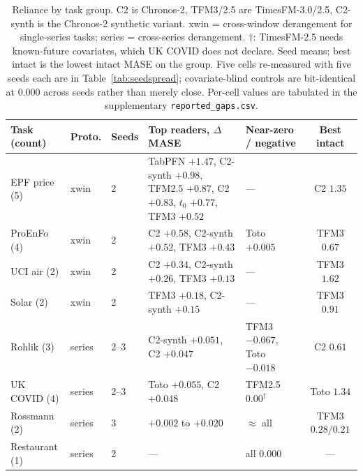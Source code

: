 \begin{table}[t]
\centering
\small
\begin{tabular}{@{}lp{0.9cm}p{0.8cm}p{6.0cm}p{3.3cm}c@{}}
\toprule
Task (count) & Proto. & Seeds & Top readers, $\Delta$MASE & Near-zero / negative & Best intact \\
\midrule
EPF price (5) & xwin & 2 & TabPFN $+1.47$, C2-synth $+0.98$, TFM2.5 $+0.87$, C2 $+0.83$, $t_0$ $+0.77$, TFM3 $+0.52$ & --- & C2 $1.35$ \\
ProEnFo (4) & xwin & 2 & C2 $+0.58$, C2-synth $+0.52$, TFM3 $+0.43$ & Toto $+0.005$ & TFM3 $0.67$ \\
UCI air (2) & xwin & 2 & C2 $+0.34$, C2-synth $+0.26$, TFM3 $+0.13$ & --- & TFM3 $1.62$ \\
Solar (2) & xwin & 2 & TFM3 $+0.18$, C2-synth $+0.15$ & --- & TFM3 $0.91$ \\
Rohlik (3) & series & 2--3 & C2-synth $+0.051$, C2 $+0.047$ & TFM3 $-0.067$, Toto $-0.018$ & C2 $0.61$ \\
UK COVID (4) & series & 2--3 & Toto $+0.055$, C2 $+0.048$ & TFM2.5 $0.00^{\dagger}$ & Toto $1.34$ \\
Rossmann (2) & series & 3 & $+0.002$ to $+0.020$ & $\approx$ all & TFM3 $0.28/0.21$ \\
Restaurant (1) & series & 2 & --- & all $0.000$ & --- \\
\bottomrule
\end{tabular}
\caption{Reliance by task group. C2 is Chronos-2, TFM3/2.5 are TimesFM-3.0/2.5,
C2-synth is the Chronos-2 synthetic variant. xwin = cross-window derangement for
single-series tasks; series = cross-series derangement. $\dagger$: TimesFM-2.5
needs known-future covariates, which UK COVID does not declare. Seed means; best
intact is the lowest intact MASE on the group. Five cells re-measured with five seeds
each are in Table~\ref{tab:seedspread}; covariate-blind
controls are bit-identical at $0.000$ across seeds rather than merely close.
Per-cell values are tabulated in the supplementary \texttt{reported\_gaps.csv}.}
\label{tab:tasks}
\end{table}
